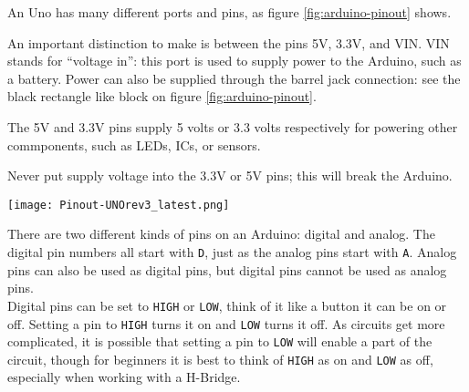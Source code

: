 \documentclass[../TinyBot.tex]{subfiles}
\begin{document}
An Uno has many different ports and pins, as figure \ref{fig:arduino-pinout} shows.

An important distinction to make is between the pins 5V, 3.3V, and VIN. VIN stands for ``voltage in'':
this port is used to supply power to the Arduino, such as a battery. Power can also be supplied through the
barrel jack connection: see the black rectangle like block on figure \ref{fig:arduino-pinout}. 

The 5V and 3.3V  pins supply 5 volts or 3.3 volts respectively for powering other commponents, such as LEDs, ICs, or sensors.  \\

\begin{warningbox}
    Never put supply voltage into the 3.3V or 5V pins; this will break the Arduino. 
\end{warningbox}


\begin{center}
    \texttt{[image: Pinout-UNOrev3\_latest.png]}
    \label{fig:arduino-pinout}
\end{center}


There are two different kinds of pins on an Arduino: digital and analog.
The digital pin numbers all start with \lstinline[]!D!, just as the analog pins start with \lstinline[]!A!.
Analog pins can also be used as digital pins, but digital pins cannot be used as analog pins. \\


Digital pins can be set to \lstinline[]!HIGH! or \lstinline[]!LOW!, think of it like a button it can be on or off.
Setting a pin to \lstinline[]!HIGH! turns it on and \lstinline[]!LOW! turns it off. As circuits get more complicated,
it is possible that setting a pin to \lstinline[]!LOW! will enable a part of the circuit,
though for beginners it is best to think of \lstinline[]!HIGH! as on and \lstinline[]!LOW! as off,
especially when working with a H-Bridge. 

\end{document}
